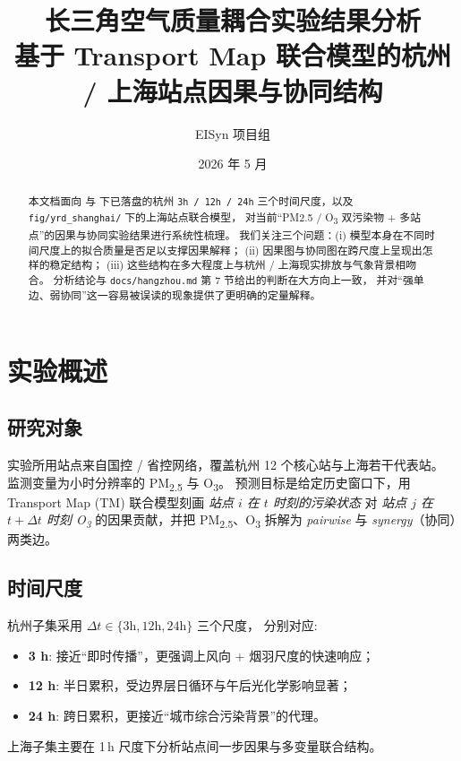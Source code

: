\documentclass[11pt,a4paper]{article}
\title{长三角空气质量耦合实验结果分析\\
\large 基于 Transport Map 联合模型的杭州 / 上海站点因果与协同结构}
\author{EISyn 项目组}
\date{2026 年 5 月}
\begin{document}
\maketitle

\begin{abstract}
本文档面向  与
 下已落盘的杭州 \texttt{3h / 12h / 24h}
三个时间尺度，以及 \texttt{fig/yrd\_shanghai/} 下的上海站点联合模型，
对当前“PM2.5 / O\textsubscript{3} 双污染物 + 多站点”的因果与协同实验结果进行系统性梳理。
我们关注三个问题：(i) 模型本身在不同时间尺度上的拟合质量是否足以支撑因果解释；
(ii) 因果图与协同图在跨尺度上呈现出怎样的稳定结构；
(iii) 这些结构在多大程度上与杭州 / 上海现实排放与气象背景相吻合。
分析结论与 \texttt{docs/hangzhou.md} 第 7 节给出的判断在大方向上一致，
并对“强单边、弱协同”这一容易被误读的现象提供了更明确的定量解释。
\end{abstract}

\tableofcontents

\section{实验概述}

\subsection{研究对象}

实验所用站点来自国控 / 省控网络，覆盖杭州 12 个核心站与上海若干代表站。
监测变量为小时分辨率的 PM\textsubscript{2.5} 与 O\textsubscript{3}。
预测目标是给定历史窗口下，用 Transport Map (TM) 联合模型刻画
\emph{站点 $i$ 在 $t$ 时刻的污染状态} 对 \emph{站点 $j$ 在 $t+\Delta t$ 时刻 O\textsubscript{3}}
的因果贡献，并把 PM\textsubscript{2.5}、O\textsubscript{3} 拆解为
\emph{pairwise} 与 \emph{synergy}（协同）两类边。

\subsection{时间尺度}

杭州子集采用 $\Delta t \in \{3\text{h}, 12\text{h}, 24\text{h}\}$ 三个尺度，
分别对应:
\begin{itemize}[leftmargin=2em]
  \item \textbf{3 h}: 接近“即时传播”，更强调上风向 + 烟羽尺度的快速响应；
  \item \textbf{12 h}: 半日累积，受边界层日循环与午后光化学影响显著；
  \item \textbf{24 h}: 跨日累积，更接近“城市综合污染背景”的代理。
\end{itemize}
上海子集主要在 1\,h 尺度下分析站点间一步因果与多变量联合结构。
\end{document}
